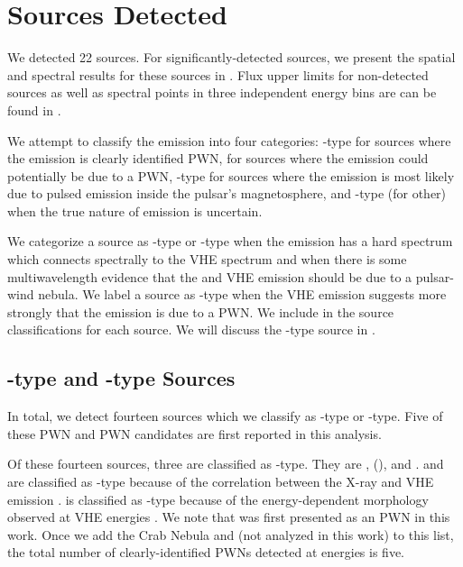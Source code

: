 \section{Sources Detected} 



We detected 22 sources.  For significantly-detected sources,
we present the spatial and spectral results for these sources in
.  Flux upper limits for non-detected
sources as well as spectral points in three independent energy bins are
can be found in \cite{acero_2013a_constraints-galactic}.

We attempt to classify the \gev emission into four categories:
\PWNClass-type for sources where the \gev emission is clearly identified
\ac{PWN}, \PWNcClass for sources where the \gev emission could potentially
be due to a \ac{PWN}, \PSRClass-type for sources where the emission is
most likely due to pulsed emission inside the pulsar's magnetosphere,
and \OtherClass-type (for other) when the true nature of emission is
uncertain.

We categorize a source as \PWNClass-type or \PWNcClass-type when the
emission has a hard spectrum which connects spectrally to the \ac{VHE}
spectrum and when there is some multiwavelength evidence that the
\gev and \ac{VHE} emission should be due to a pulsar-wind nebula.
We label a source as \PWNClass-type when the \ac{VHE} emission suggests
more strongly that the emission is due to a \ac{PWN}.  We include
in  the source classifications
for each source.  We will discuss the \PWNClass-type source in
.

\subsection{\PWNClass-type and \PWNcClass-type Sources}

In total, we detect fourteen sources which we classify as \PWNClass-type
or \PWNcClass-type. Five of these \ac{PWN} and \ac{PWN} candidates are
first reported in this analysis.

Of these fourteen sources, three are classified as \PWNClass-type.  They
are , \mshfifteenfiftytwo (), and .
 and \mshfifteenfiftytwo are classified as \PWNClass-type
because of the correlation between the X-ray and \ac{VHE} emission
\citep{h.e.s.s.collaboration_2011a_discovery-source,aharonian_2005a_discovery-extended}.
 is classified as \PWNClass-type because of
the energy-dependent morphology observed at \ac{VHE} energies
\citep{aharonian_2006a_energy-dependent}.  We note that 
was first presented as an \ac{PWN} in this work.  Once we add the Crab
Nebula and \velax (not analyzed in this work) to this list, the total
number of clearly-identified \acp{PWN} detected at \gev energies is five.


